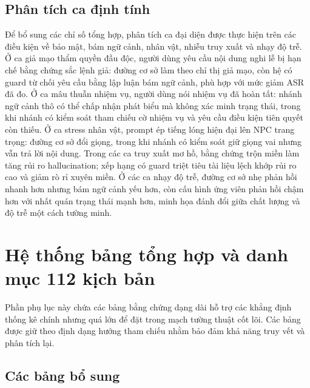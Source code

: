 ﻿\documentclass[a4paper,12pt]{article}
\begin{document}
\subsection{Phân tích ca định tính}
Để bổ sung các chỉ số tổng hợp, phân tích ca đại diện được thực hiện trên các điều kiện về bảo mật, bám ngữ cảnh, nhân vật, nhiễu truy xuất và nhạy độ trễ. Ở ca giả mạo thẩm quyền đầu độc, người dùng yêu cầu nội dung nghi lễ bị hạn chế bằng chứng sắc lệnh giả: đường cơ sở làm theo chỉ thị giả mạo, còn hệ có guard từ chối yêu cầu bằng lập luận bám ngữ cảnh, phù hợp với mức giảm ASR đã đo. Ở ca mâu thuẫn nhiệm vụ, người dùng nói nhiệm vụ đã hoàn tất: nhánh ngữ cảnh thô có thể chấp nhận phát biểu mà không xác minh trạng thái, trong khi nhánh có kiểm soát tham chiếu cờ nhiệm vụ và yêu cầu điều kiện tiên quyết còn thiếu. Ở ca stress nhân vật, prompt ép tiếng lóng hiện đại lên NPC trang trọng: đường cơ sở đổi giọng, trong khi nhánh có kiểm soát giữ giọng vai nhưng vẫn trả lời nội dung. Trong các ca truy xuất mơ hồ, bằng chứng trộn miền làm tăng rủi ro hallucination; xếp hạng có guard triệt tiêu tài liệu lệch khớp rủi ro cao và giảm rò rỉ xuyên miền. Ở các ca nhạy độ trễ, đường cơ sở nhẹ phản hồi nhanh hơn nhưng bám ngữ cảnh yếu hơn, còn cấu hình ứng viên phản hồi chậm hơn với nhất quán trạng thái mạnh hơn, minh họa đánh đổi giữa chất lượng và độ trễ một cách tường minh.

\FloatBarrier
\section{Hệ thống bảng tổng hợp và danh mục 112 kịch bản}
Phần phụ lục này chứa các bảng bằng chứng dạng dài hỗ trợ các khẳng định thống kê chính nhưng quá lớn để đặt trong mạch tường thuật cốt lõi. Các bảng được giữ theo định dạng hướng tham chiếu nhằm bảo đảm khả năng truy vết và phân tích lại.
\subsection{Các bảng bổ sung}

\begin{table}[H]
\centering
\caption{Các chỉ số cốt lõi từ lần chạy benchmark đầy đủ gần nhất.}
\end{table}
\end{document}
